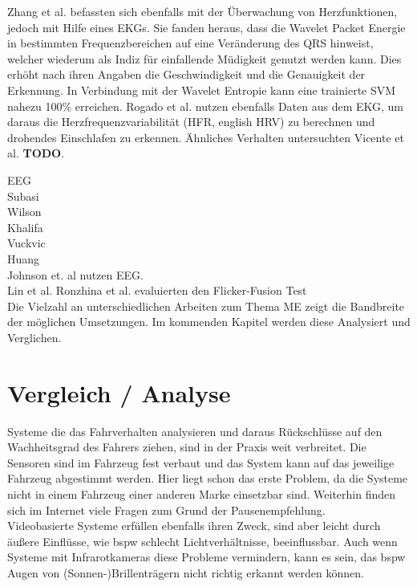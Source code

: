 {Zhang et al. \cite{zhang_6513058} befassten sich ebenfalls mit der Überwachung von Herzfunktionen, jedoch mit Hilfe eines EKGs. Sie fanden heraus, dass die Wavelet Packet Energie in bestimmten Frequenzbereichen auf eine Veränderung des QRS hinweist, welcher wiederum als Indiz für einfallende Müdigkeit genutzt werden kann. Dies erhöht nach ihren Angaben die Geschwindigkeit und die Genauigkeit der Erkennung. In Verbindung mit der Wavelet Entropie kann eine trainierte SVM nahezu 100\% erreichen. Rogado et al. \cite{Rogado_4913155} nutzen ebenfalls Daten aus dem EKG, um daraus die Herzfrequenzvariabilität (HFR, english HRV) zu berechnen und drohendes Einschlafen zu erkennen. Ähnliches Verhalten untersuchten Vicente et al. \cite{Vicente_6164509} \textbf{TODO}.  

EEG \\
Subasi \cite{Subasi:2005:ARA:1707423.1707550}\\
Wilson \cite{wilson_890161}\\
Khalifa \cite{khalifa_893852}\\
Vuckvic \cite{Vuckovic2002349}\\
Huang \cite{Huang_548971}\\
Johnson et. al \cite{Johnson11} nutzen EEG.\\
Lin et al. \cite{Lin05eeg-baseddrowsiness}
Ronzhina et al. \cite{Ronzhina:2011:UEV:2093698.2093733} evaluierten den Flicker-Fusion Test \\

Die Vielzahl an unterschiedlichen Arbeiten zum Thema \acl{ME} zeigt die Bandbreite der möglichen Umsetzungen. Im kommenden Kapitel werden diese Analysiert und Verglichen.

\section{Vergleich / Analyse}
\label{chap:an}
Systeme die das Fahrverhalten analysieren und daraus Rückschlüsse auf den Wachheitsgrad des Fahrers ziehen, sind in der Praxis weit verbreitet. Die Sensoren sind im Fahrzeug fest verbaut und das System kann auf das jeweilige Fahrzeug abgestimmt werden. Hier liegt schon das erste Problem, da die Systeme nicht in einem Fahrzeug einer anderen Marke einsetzbar sind. Weiterhin finden sich im Internet viele Fragen zum Grund der Pausenempfehlung. \\

Videobasierte Systeme erfüllen ebenfalls ihren Zweck, sind aber leicht durch äußere Einflüsse, wie \acl{bspw} schlecht Lichtverhältnisse, beeinflussbar. Auch wenn Systeme mit Infrarotkameras diese Probleme vermindern, kann es sein, das \acl{bspw} Augen von (Sonnen-)Brillenträgern nicht richtig erkannt werden können. \\

}
